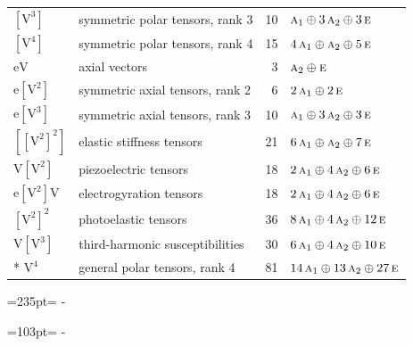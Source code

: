 \documentclass[10pt,a4paper]{article}
\newcommand{\needspace}[1]{\par\penalty-100\begingroup\dimen0=#1\relax\dimen2=\pagegoal
  \advance\dimen2-\pagetotal\ifdim\dimen0>\dimen2\relax\ifdim\dimen2>0pt\vfil\break\fi\fi
  \endgroup}
\numberwithin{equation}{section}
\newcommand{\irr}[1]{\text{\normalfont\scshape #1}}
\newcommand{\jahn}[1]{\mathrm{#1}}
\newlength{\fillwidth}\newlength{\cellwidth}\newlength{\colwidth}
\begin{document}
{\begin{longtable}{@{}llr>{\RaggedRight\arraybackslash}p{\fillwidth}@{}}
$\jahn{[V^{3}]}$ & symmetric polar tensors, rank 3 & 10 & $\irr{a}_{1} \oplus\allowbreak 3\,\irr{a}_{2} \oplus\allowbreak 3\,\irr{e}$\\
$\jahn{[V^{4}]}$ & symmetric polar tensors, rank 4 & 15 & $4\,\irr{a}_{1} \oplus\allowbreak \irr{a}_{2} \oplus\allowbreak 5\,\irr{e}$\\
$\jahn{eV}$ & axial vectors & 3 & $\irr{a}_{2} \oplus\allowbreak \irr{e}$\\
$\jahn{e[V^{2}]}$ & symmetric axial tensors, rank 2 & 6 & $2\,\irr{a}_{1} \oplus\allowbreak 2\,\irr{e}$\\
$\jahn{e[V^{3}]}$ & symmetric axial tensors, rank 3 & 10 & $\irr{a}_{1} \oplus\allowbreak 3\,\irr{a}_{2} \oplus\allowbreak 3\,\irr{e}$\\
$\jahn{[[V^{2}]^{2}]}$ & elastic stiffness tensors & 21 & $6\,\irr{a}_{1} \oplus\allowbreak \irr{a}_{2} \oplus\allowbreak 7\,\irr{e}$\\
$\jahn{V[V^{2}]}$ & piezoelectric tensors & 18 & $2\,\irr{a}_{1} \oplus\allowbreak 4\,\irr{a}_{2} \oplus\allowbreak 6\,\irr{e}$\\
$\jahn{e[V^{2}]V}$ & electrogyration tensors & 18 & $2\,\irr{a}_{1} \oplus\allowbreak 4\,\irr{a}_{2} \oplus\allowbreak 6\,\irr{e}$\\
$\jahn{[V^{2}]^{2}}$ & photoelastic tensors & 36 & $8\,\irr{a}_{1} \oplus\allowbreak 4\,\irr{a}_{2} \oplus\allowbreak 12\,\irr{e}$\\
$\jahn{V[V^{3}]}$ & third-harmonic susceptibilities & 30 & $6\,\irr{a}_{1} \oplus\allowbreak 4\,\irr{a}_{2} \oplus\allowbreak 10\,\irr{e}$\\*
$\jahn{V^{4}}$ & general polar tensors, rank 4 & 81 & $14\,\irr{a}_{1} \oplus\allowbreak 13\,\irr{a}_{2} \oplus\allowbreak 27\,\irr{e}$\\
\bottomrule\end{longtable}}
\needspace{235pt}
\needspace{103pt}
\end{document}

